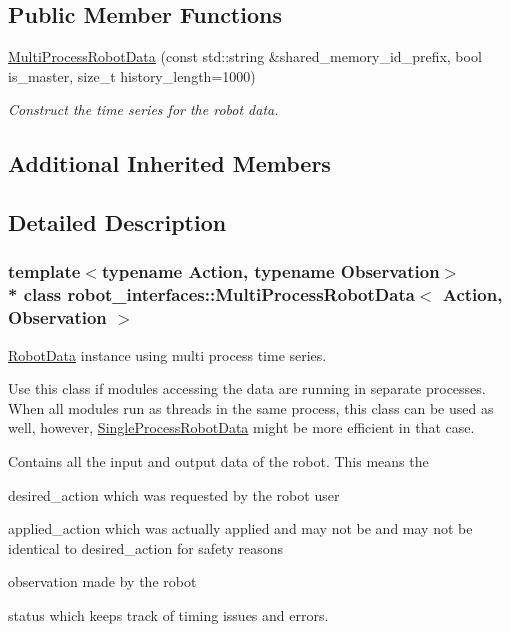 \subsection*{Public Member Functions}
\begin{DoxyCompactItemize}
\item 
\hyperlink{classrobot__interfaces_1_1MultiProcessRobotData_a27bb5ee187ceacb386d89c828481b057}{Multi\+Process\+Robot\+Data} (const std\+::string \&shared\+\_\+memory\+\_\+id\+\_\+prefix, bool is\+\_\+master, size\+\_\+t history\+\_\+length=1000)
\begin{DoxyCompactList}\small\item\em Construct the time series for the robot data. \end{DoxyCompactList}\end{DoxyCompactItemize}
\subsection*{Additional Inherited Members}


\subsection{Detailed Description}
\subsubsection*{template$<$typename Action, typename Observation$>$\\*
class robot\+\_\+interfaces\+::\+Multi\+Process\+Robot\+Data$<$ Action, Observation $>$}

\hyperlink{classrobot__interfaces_1_1RobotData}{Robot\+Data} instance using multi process time series. 

Use this class if modules accessing the data are running in separate processes. When all modules run as threads in the same process, this class can be used as well, however, \hyperlink{classrobot__interfaces_1_1SingleProcessRobotData}{Single\+Process\+Robot\+Data} might be more efficient in that case.

Contains all the input and output data of the robot. This means the
\begin{DoxyItemize}
\item {\ttfamily desired\+\_\+action} which was requested by the robot user
\item {\ttfamily applied\+\_\+action} which was actually applied and may not be and may not be identical to desired\+\_\+action for safety reasons
\item {\ttfamily observation} made by the robot
\item {\ttfamily status} which keeps track of timing issues and errors.
\end{DoxyItemize}

